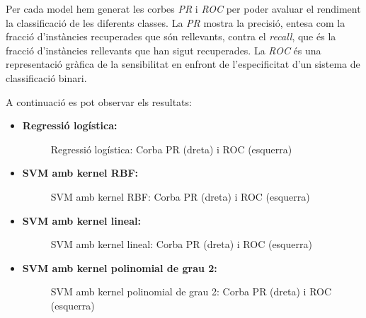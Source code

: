 \documentclass[a4paper, 11pt]{article}
\begin{document}
    Per cada model hem generat les corbes \textit{PR} i \textit{ROC} per poder avaluar el rendiment la classificació de les diferents classes. La \textit{PR} mostra la precisió, entesa com la fracció d'instàncies recuperades que són rellevants, contra el \textit{recall}, que és la fracció d'instàncies rellevants que han sigut recuperades. La \textit{ROC} és una representació gràfica de la sensibilitat en enfront de l'especificitat d'un sistema de classificació binari.

    A continuació es pot observar els resultats:
        \begin{itemize}
            \item \textbf{Regressió logística:}


                \begin{figure}[H]%
                \centering
                \qquad
                \caption*{Regressió logística: Corba PR (dreta) i ROC (esquerra)}
                \end{figure}

            \item \textbf{SVM amb kernel RBF:}


                \begin{figure}[H]%
                \centering
                \qquad
                \caption*{SVM amb kernel RBF: Corba PR (dreta) i ROC (esquerra)}
                \end{figure}

            \newpage
            \item \textbf{SVM amb kernel lineal:}


                \begin{figure}[H]%
                \centering
                \qquad
                \caption*{SVM amb kernel lineal: Corba PR (dreta) i ROC (esquerra)}
                \end{figure}


            \item \textbf{SVM amb kernel polinomial de grau 2:}


                \begin{figure}[H]%
                \centering
                \qquad
                \caption*{SVM amb kernel polinomial de grau 2: Corba PR (dreta) i ROC (esquerra)}
                \end{figure}



\end{itemize}
\end{document}
